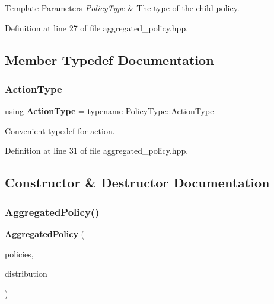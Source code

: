 \begin{DoxyTemplParams}{Template Parameters}
{\em Policy\+Type} & The type of the child policy. \\
\hline
\end{DoxyTemplParams}


Definition at line 27 of file aggregated\+\_\+policy.\+hpp.



\subsection{Member Typedef Documentation}
\mbox{\label{classmlpack_1_1rl_1_1AggregatedPolicy_afb9320b245a1358ab02e3f57e3b0a597}} 
\subsubsection{Action\+Type}
{\footnotesize\ttfamily using \textbf{ Action\+Type} =  typename Policy\+Type\+::\+Action\+Type}



Convenient typedef for action. 



Definition at line 31 of file aggregated\+\_\+policy.\+hpp.



\subsection{Constructor \& Destructor Documentation}
\mbox{\label{classmlpack_1_1rl_1_1AggregatedPolicy_aee7c1ebbfd95024c0b1d2a580ceebb14}} 
\subsubsection{Aggregated\+Policy()}
{\footnotesize\ttfamily \textbf{ Aggregated\+Policy} (\begin{DoxyParamCaption}\item[{std\+::vector$<$ Policy\+Type $>$}]{policies,  }\item[{const arma\+::colvec \&}]{distribution }\end{DoxyParamCaption})\hspace{0.3cm}{\ttfamily [inline]}}


